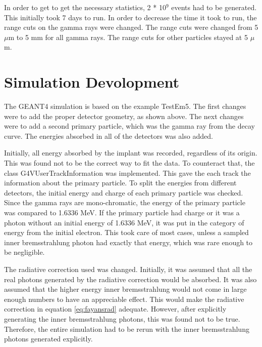 In order to get to get the necessary statistics, 2 * 10$^{9}$ events had to be generated. 
This initially took 7 days to run. 
In order to decrease the time it took to run, the range cuts on the gamma rays were changed.
The range cuts were changed from 5 $\mu$m to 5 mm for all gamma rays.
The range cuts for other particles stayed at 5 $\mu$m.

\section{Simulation Devolopment}
The GEANT4 simulation is based on the example TestEm5.
The first changes were to add the proper detector geometry, as shown above.
The next changes were to add a second primary particle, which was the gamma ray from the decay curve.
The energies absorbed in all of the detectors was also added.

Initially, all energy absorbed by the implant was recorded, regardless of its origin.
This was found not to be the correct way to fit the data.
To counteract that, the class G4VUserTrackInformation was implemented.
This gave the each track the information about the primary particle.
To split the energies from different detectors, the initial energy and charge of each primary particle was checked.
Since the gamma rays are mono-chromatic, the energy of the primary particle was compared to 1.6336 MeV.
If the primary particle had charge or it was a photon without an initial energy of 1.6336 MeV, it was put in the category of energy from the initial electron. 
This took care of most cases, unless a sampled inner bremsstrahlung photon had exactly that energy, which was rare enough to be negligible.

The radiative correction used was changed.
Initially, it was assumed that all the real photons generated by the radiative correction would be absorbed.
It was also assumed that the higher energy inner bremsstrahlung would not come in large enough numbers to have an appreciable effect. 
This would make the radiative correction in equation \ref{eq:fayansrad} adequate. 
However, after explicitly generating the inner bremsstrahlung photons, this was found not to be true.
Therefore, the entire simulation had to be rerun with the inner bremsstrahlung photons generated explicitly.
  

